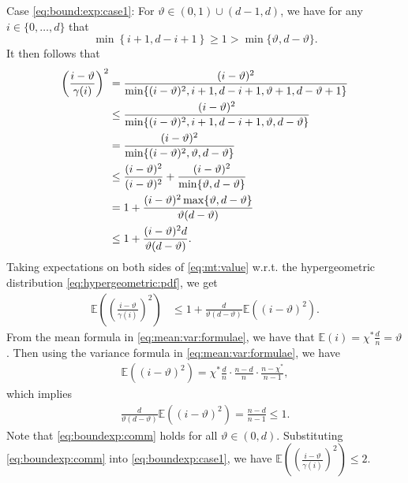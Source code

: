 \documentclass[onecolumn,letterpaper]{IEEEtran}
\newcommand{\plsize}{{\chi}}
\newcommand{\apn}{{\gamma}}
\newcommand{\cE}{{\mathbb{E}}}
\newcommand{\mnp}{{\vartheta}}
\newcommand{\idex}{{i}}
\begin{document}
Case \ref{eq:bound:exp:case1}: For $\mnp \in (0,1)\cup (d-1,d)$, we have for any $\idex \in \{0,\dots, d\}$ that 
\begin{equation}
    \min\left\{ \idex+1 , d-\idex+1 \right\} \ge 1 > \min\{ \mnp , d-\mnp \}.
\end{equation}
It then follows that 
\begin{align}
\label{eq:mt:value}
   \left(\frac{\idex-\mnp}{\apn(\idex)}\right)^2 &= \frac{(\idex-\mnp)^2}{\min \{ (\idex - \mnp)^2, \idex+1, d-\idex+1, \mnp+1, d-\mnp+1 \}} \notag\\
    &\le \frac{(\idex-\mnp)^2}{\min \{ (\idex - \mnp)^2, \idex+1, d-\idex+1, \mnp, d-\mnp \}} \notag\\
    &= \frac{(\idex-\mnp)^2}{\min \{ (\idex - \mnp)^2, \mnp, d-\mnp \}} \notag\\
    &\le \frac{(\idex-\mnp)^2}{(\idex - \mnp)^2} + \frac{(\idex-\mnp)^2}{\min\{\mnp, d-\mnp\}} \notag\\
    &= 1 + \frac{(\idex-\mnp)^2 \max\{\mnp, d-\mnp\}}{\mnp(d-\mnp)} \notag\\
    &\le 1 + \frac{(\idex-\mnp)^2 d}{\mnp(d-\mnp)}.
\end{align}
Taking expectations on both sides of \eqref{eq:mt:value} w.r.t. the hypergeometric distribution \eqref{eq:hypergeometric:pdf}, we get
\begin{align}
\label{eq:boundexp:case1}
    \cE \left(  \left(\frac{\idex-\mnp}{\apn(\idex)}\right)^2 \right) &\le 1+ \frac{ d}{\mnp(d-\mnp)}\cE \left((\idex-\mnp)^2  \right).
\end{align}
From the mean formula in \eqref{eq:mean:var:formulae}, we have that 
$\cE(\idex)= \plsize^{*} \frac d n =\mnp$. 
Then using the variance formula in \eqref{eq:mean:var:formulae}, we have
\begin{align*}
    \cE \left( (\idex-\mnp)^2\right) =  \plsize^{*} \frac{d}{n}\cdot \frac{n-d}{n}\cdot \frac{n-\plsize^{*}}{n-1},
\end{align*}
which implies 
 \begin{align}
 \label{eq:boundexp:comm}
  \frac{ d}{\mnp(d-\mnp)}  \cE \left( (\idex-\mnp)^2\right) =  \frac{n-d}{n-1} \leq 1.
\end{align}
Note that \eqref{eq:boundexp:comm} holds for all $\mnp\in(0,d)$.
Substituting \eqref{eq:boundexp:comm} into \eqref{eq:boundexp:case1}, we have  $\cE \left( \left(\frac{\idex-\mnp}{\apn(\idex)}\right)^2 \right) \leq 2$. 
\end{document}
